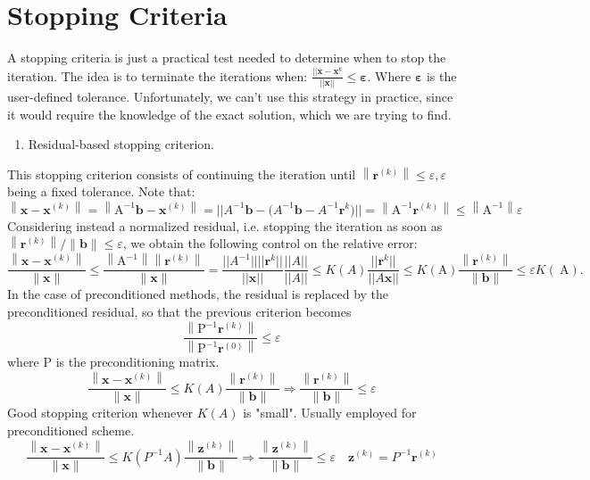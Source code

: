 \documentclass[11pt]{book}
\begin{document}
\section*{Stopping Criteria}
A stopping criteria is just a  practical test needed to determine when to stop the iteration. The idea is to terminate the iterations when: $ \frac{|| \boldsymbol{x}-\boldsymbol{x}^k}{||\boldsymbol{x}||} \leq \boldsymbol{\varepsilon}$.
Where $\boldsymbol{\varepsilon}$ is the user-defined tolerance. Unfortunately, we can't use this strategy in practice, since it would require the knowledge of the exact solution, which we are trying to find.
\begin{enumerate}
  \item Residual-based stopping criterion.
\end{enumerate}
This stopping criterion consists of continuing the iteration until $\left\|\mathbf{r}^{(k)}\right\| \leq \varepsilon, \varepsilon$ being a fixed tolerance. Note that:
$$
\left\|\mathbf{x}-\mathbf{x}^{(k)}\right\|=\left\|\mathrm{A}^{-1} \mathbf{b}-\mathbf{x}^{(k)}\right\|= || A^{-1}\mathbf{b}-\bigl(A^{-1}\mathbf{b}-A^{-1}\mathbf{r}^{k} \bigl) || = \left\|\mathrm{A}^{-1} \mathbf{r}^{(k)}\right\| \leq\left\|\mathrm{A}^{-1}\right\| \varepsilon
$$
Considering instead a normalized residual, i.e. stopping the iteration as soon as $\left\|\mathbf{r}^{(k)}\right\| /\|\mathbf{b}\| \leq \varepsilon$, we obtain the following control on the relative error:
$$
\frac{\left\|\mathbf{x}-\mathbf{x}^{(k)}\right\|}{\|\mathbf{x}\|} \leq \frac{\left\|\mathrm{A}^{-1}\right\|\left\|\mathbf{r}^{(k)}\right\|}{\|\mathbf{x}\|} = \frac{||A^{-1}|| ||\mathbf{r}^{k}||}{|| \mathbf{x} ||} \frac{||A||}{||A||} \leq K(A) \frac{||\mathbf{r}^{k}||}{||A\mathbf{x}||} \leq K(\mathrm{A}) \frac{\left\|\mathbf{r}^{(k)}\right\|}{\|\mathbf{b}\|} \leq \varepsilon K(\mathrm{~A}) .
$$
In the case of preconditioned methods, the residual is replaced by the preconditioned residual, so that the previous criterion becomes
$$
\frac{\left\|\mathrm{P}^{-1} \mathbf{r}^{(k)}\right\|}{\left\|\mathrm{P}^{-1} \mathbf{r}^{(0)}\right\|} \leq \varepsilon
$$
where $\mathrm{P}$ is the preconditioning matrix.
$$
\frac{\left\|\boldsymbol{x}-\boldsymbol{x}^{(k)}\right\|}{\|\boldsymbol{x}\|} \leq K(A) \frac{\left\|\boldsymbol{r}^{(k)}\right\|}{\|\boldsymbol{b}\|} \Longrightarrow \frac{\left\|\boldsymbol{r}^{(k)}\right\|}{\|\boldsymbol{b}\|} \leq \varepsilon
$$
Good stopping criterion whenever $K(A)$ is "small".
Usually employed for preconditioned scheme.
$$
\frac{\left\|\boldsymbol{x}-\boldsymbol{x}^{(k)}\right\|}{\|\boldsymbol{x}\|} \leq K\left(P^{-1} A\right) \frac{\left\|\boldsymbol{z}^{(k)}\right\|}{\|\boldsymbol{b}\|} \Longrightarrow \frac{\left\|\boldsymbol{z}^{(k)}\right\|}{\|\boldsymbol{b}\|} \leq \varepsilon \quad \boldsymbol{z}^{(k)}=P^{-1} \boldsymbol{r}^{(k)}
$$
\end{document}
